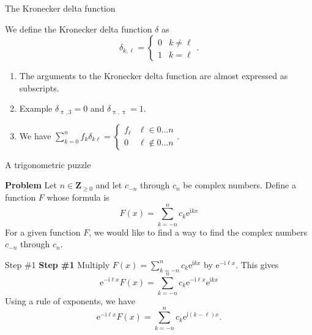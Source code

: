 \documentclass[portrait,fleqn,12pt]{beamer}
\newcommand{\integers}{\mathbf{Z}}
\newcommand{\euler}{\mathrm{e}}
\newcommand{\imag}{\mathrm{i}}
\newenvironment{handlist}
   {\begin{enumerate}[\faHandPointRight]
       \addtolength{\itemsep}{0.0\itemsep}}
     {\end{enumerate}}
\begin{document}
\begin{frame}{The  Kronecker delta function}

We define the Kronecker delta function $\delta$ as
\begin{equation*}
   \delta_{k, \ell} = \begin{cases} 0 & k \neq \ell \\ 1 & k= \ell \end{cases}.
\end{equation*}

\begin{handlist}
\item The arguments to the Kronecker delta function are almost expressed as subscripts.

\item Example $\delta_{\uppi, 3} = 0$ and $\delta_{\uppi, \uppi} = 1$.

\item We have $\sum_{k=0}^n f_k \delta_{k\ell} = \begin{cases} f_\ell &  \ell \in 0 \dots n \\ 0 & \ell \notin 0 \dots n  \end{cases}$.
\end{handlist}
\end{frame}


\begin{frame}{A trigonometric puzzle}

\textbf{Problem} Let $n \in \integers_{\geq 0}$ and let $c_{-n}$ through $c_n$ be complex numbers. Define a 
function $F$ whose formula is 
\begin{equation*}
    F(x) = \sum_{k=-n}^n c_k \euler^{\imag  k x}
\end{equation*}
For a given function $F$, we would like to find a way to find the complex numbers $c_{-n}$ through $c_n$.

\end{frame}

\begin{frame}{Step \#1}
\textbf{Step \#1} Multiply $\displaystyle F(x) = \sum_{k=-n}^n c_k \euler^{\imag  k x}$  by $\euler^{-\imag  \ell x}$. This 
gives
\begin{equation}
    \euler^{-\imag  \ell x} F(x) = \sum_{k=-n}^n c_k 
    \euler^{-\imag  \ell x} \euler^{\imag  k x}
\end{equation}
Using a rule of exponents, we have
\begin{equation}
    \euler^{-\imag  \ell x} F(x) = \sum_{k=-n}^n c_k 
    \euler^{\imag  (k - \ell) x}.
\end{equation}
\end{frame}
\end{document}
